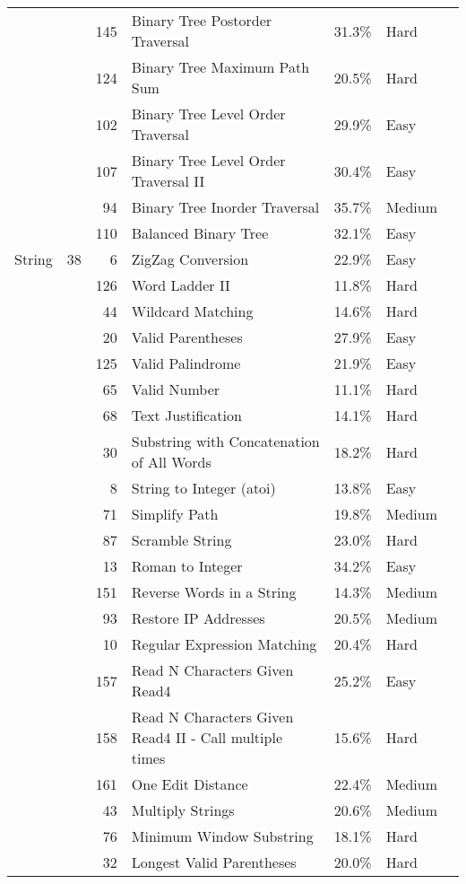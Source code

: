 \documentclass[9pt,b5paper]{article}
\begin{document}
\begin{center}
\begin{tabular}{lrrllll}
 &  & 145 & Binary Tree Postorder Traversal & 31.3\% & Hard & \\
 &  & 124 & Binary Tree Maximum Path Sum & 20.5\% & Hard & \\
 &  & 102 & Binary Tree Level Order Traversal & 29.9\% & Easy & \\
 &  & 107 & Binary Tree Level Order Traversal II & 30.4\% & Easy & \\
 &  & 94 & Binary Tree Inorder Traversal & 35.7\% & Medium & \\
 &  & 110 & Balanced Binary Tree & 32.1\% & Easy & \\
\hline
String & 38 & 6 & ZigZag Conversion & 22.9\% & Easy & \\
 &  & 126 & Word Ladder II & 11.8\% & Hard & \\
 &  & 44 & Wildcard Matching & 14.6\% & Hard & \\
 &  & 20 & Valid Parentheses & 27.9\% & Easy & \\
 &  & 125 & Valid Palindrome & 21.9\% & Easy & \\
 &  & 65 & Valid Number & 11.1\% & Hard & \\
 &  & 68 & Text Justification & 14.1\% & Hard & \\
 &  & 30 & Substring with Concatenation of All Words & 18.2\% & Hard & \\
 &  & 8 & String to Integer (atoi) & 13.8\% & Easy & \\
 &  & 71 & Simplify Path & 19.8\% & Medium & \\
 &  & 87 & Scramble String & 23.0\% & Hard & \\
 &  & 13 & Roman to Integer & 34.2\% & Easy & \\
 &  & 151 & Reverse Words in a String & 14.3\% & Medium & \\
 &  & 93 & Restore IP Addresses & 20.5\% & Medium & \\
 &  & 10 & Regular Expression Matching & 20.4\% & Hard & \\
 &  & 157 & Read N Characters Given Read4 & 25.2\% & Easy & \\
 &  & 158 & Read N Characters Given Read4 II - Call multiple times & 15.6\% & Hard & \\
 &  & 161 & One Edit Distance & 22.4\% & Medium & \\
 &  & 43 & Multiply Strings & 20.6\% & Medium & \\
 &  & 76 & Minimum Window Substring & 18.1\% & Hard & \\
 &  & 32 & Longest Valid Parentheses & 20.0\% & Hard & \\

\end{tabular}
\end{center}
\end{document}
